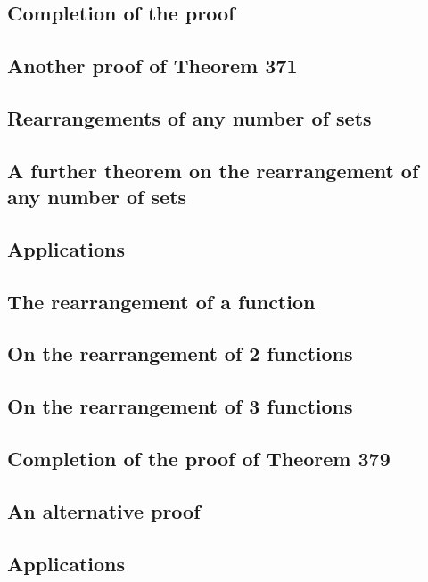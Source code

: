 \documentclass[oneside]{book}
\numberwithin{equation}{section}
\begin{document}
\subsection{Completion of the proof}

\subsection{Another proof of Theorem 371}

\subsection{Rearrangements of any number of sets}

\subsection{A further theorem on the rearrangement of any number of sets}

\subsection{Applications}

\subsection{The rearrangement of a function}

\subsection{On the rearrangement of 2 functions}

\subsection{On the rearrangement of 3 functions}

\subsection{Completion of the proof of Theorem 379}

\subsection{An alternative proof}

\subsection{Applications}
\end{document}
